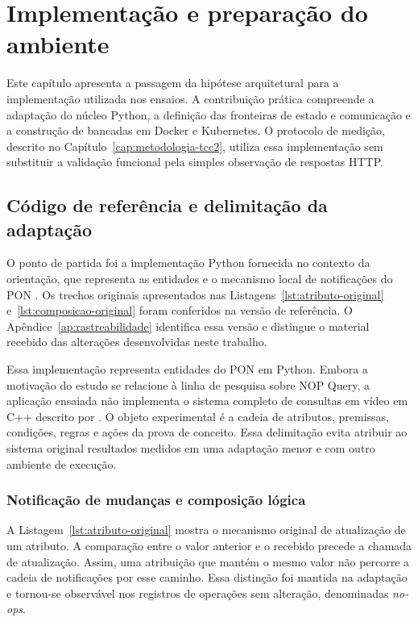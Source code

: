 \chapter{Implementação e preparação do ambiente}
\label{cap:implementacao}

Este capítulo apresenta a passagem da hipótese arquitetural para a implementação utilizada nos ensaios. A contribuição prática compreende a adaptação do núcleo Python, a definição das fronteiras de estado e comunicação e a construção de bancadas em Docker e Kubernetes. O protocolo de medição, descrito no Capítulo~\ref{cap:metodologia-tcc2}, utiliza essa implementação sem substituir a validação funcional pela simples observação de respostas HTTP.

\section{Código de referência e delimitação da adaptação}

O ponto de partida foi a implementação Python fornecida no contexto da orientação, que representa as entidades e o mecanismo local de notificações do PON \cite{codigoponreferencia}. Os trechos originais apresentados nas Listagens~\ref{lst:atributo-original} e~\ref{lst:composicao-original} foram conferidos na versão de referência. O Apêndice~\ref{ap:rastreabilidade} identifica essa versão e distingue o material recebido das alterações desenvolvidas neste trabalho.

Essa implementação representa entidades do PON em Python. Embora a motivação do estudo se relacione à linha de pesquisa sobre NOP Query, a aplicação ensaiada não implementa o sistema completo de consultas em vídeo em C++ descrito por . O objeto experimental é a cadeia de atributos, premissas, condições, regras e ações da prova de conceito. Essa delimitação evita atribuir ao sistema original resultados medidos em uma adaptação menor e com outro ambiente de execução.

\subsection{Notificação de mudanças e composição lógica}

A Listagem~\ref{lst:atributo-original} mostra o mecanismo original de atualização de um atributo. A comparação entre o valor anterior e o recebido precede a chamada de atualização. Assim, uma atribuição que mantém o mesmo valor não percorre a cadeia de notificações por esse caminho. Essa distinção foi mantida na adaptação e tornou-se observável nos registros de operações sem alteração, denominadas \textit{no-ops}.

